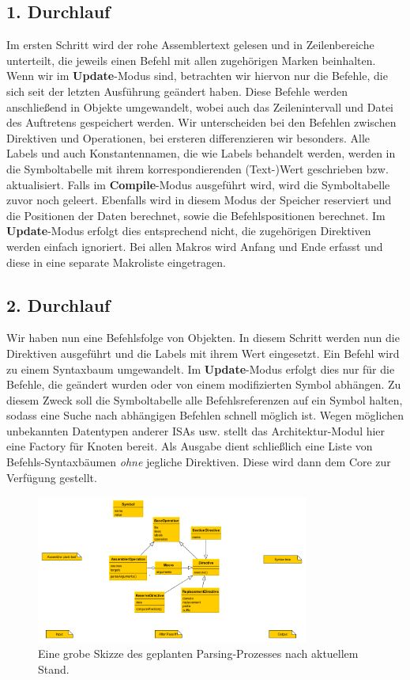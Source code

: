 \subsection{1. Durchlauf}

Im ersten Schritt wird der rohe Assemblertext gelesen und in Zeilenbereiche
unterteilt, die jeweils einen Befehl mit allen zugehörigen Marken beinhalten.
Wenn wir im \textbf{Update}-Modus sind, betrachten wir hiervon nur die Befehle, die sich seit der letzten Ausführung geändert haben.
Diese Befehle werden anschließend in Objekte umgewandelt, wobei auch das Zeilenintervall und Datei des Auftretens gespeichert werden. Wir unterscheiden bei den Befehlen zwischen Direktiven und Operationen, bei ersteren differenzieren wir besonders. Alle Labels und auch Konstantennamen, die wie Labels behandelt werden, werden in die Symboltabelle mit ihrem
korrespondierenden (Text-)Wert geschrieben bzw. aktualisiert. Falls im \textbf{Compile}-Modus ausgeführt wird, wird die Symboltabelle zuvor noch geleert. Ebenfalls wird in diesem Modus der Speicher reserviert
und die Positionen der Daten berechnet, sowie die Befehlspositionen berechnet. Im \textbf{Update}-Modus erfolgt dies entsprechend nicht, die zugehörigen Direktiven werden einfach ignoriert.  Bei allen Makros wird Anfang und Ende erfasst und diese in eine separate Makroliste eingetragen.

\subsection{2. Durchlauf}

Wir haben nun eine Befehlsfolge von Objekten. In diesem Schritt werden nun die
Direktiven ausgeführt und die Labels mit ihrem Wert eingesetzt. Ein Befehl wird
zu einem Syntaxbaum umgewandelt. Im \textbf{Update}-Modus erfolgt dies nur für die Befehle, die geändert wurden oder von einem modifizierten Symbol abhängen. Zu diesem Zweck soll die Symboltabelle alle Befehlsreferenzen auf ein Symbol halten, sodass eine Suche nach abhängigen Befehlen schnell möglich ist.
Wegen möglichen unbekannten Datentypen anderer ISAs usw. stellt das Architektur-Modul hier eine Factory für
Knoten bereit.  Als Ausgabe dient schließlich eine
Liste von Befehls-Syntaxbäumen \emph{ohne} jegliche Direktiven. Diese wird dann dem Core zur Verfügung gestellt.

\begin{figure}[h!]
  \centering
  \includegraphics[width=0.8\textwidth]{../parser/figures/process.png}
  \caption{Eine grobe Skizze des geplanten Parsing-Prozesses nach aktuellem Stand.}
\end{figure}

